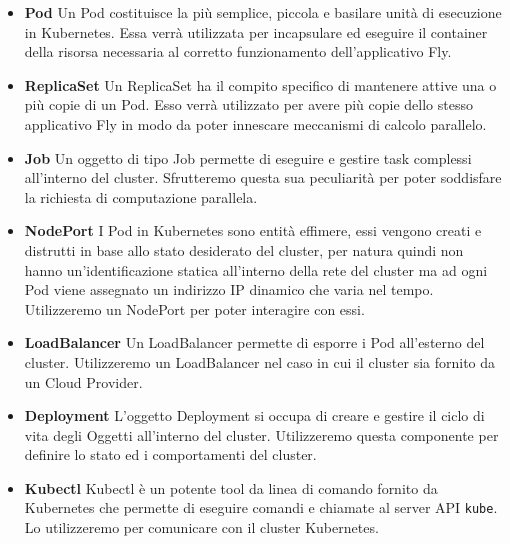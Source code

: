 \begin{itemize}
  \item\textbf{Pod} Un Pod costituisce la più semplice, piccola e basilare unità di esecuzione in Kubernetes. Essa verrà utilizzata per incapsulare ed eseguire il container della risorsa necessaria al corretto funzionamento
  dell'applicativo Fly.
  \item\textbf{ReplicaSet} Un ReplicaSet ha il compito specifico di mantenere attive una o più copie di un Pod. Esso verrà utilizzato per avere più copie dello stesso applicativo Fly in modo da poter innescare meccanismi di calcolo parallelo.
  \item\textbf{Job} Un oggetto di tipo Job permette di eseguire e gestire task complessi all'interno del cluster. Sfrutteremo questa sua peculiarità per poter soddisfare la richiesta di computazione parallela.
  \item\textbf{NodePort} I Pod in Kubernetes sono entità effimere, essi vengono creati e distrutti in base allo stato desiderato del cluster, per natura quindi non hanno un'identificazione statica all'interno della rete del cluster ma ad ogni Pod viene assegnato un indirizzo IP dinamico che varia nel tempo.
  Utilizzeremo un NodePort per poter interagire con essi.
  \item\textbf{LoadBalancer} Un LoadBalancer permette di esporre i Pod all'esterno del cluster. Utilizzeremo un LoadBalancer nel caso in cui il cluster sia fornito da un Cloud Provider.
  \item\textbf{Deployment} L'oggetto Deployment si occupa di creare e gestire il ciclo di vita degli Oggetti all'interno del cluster. Utilizzeremo questa componente per definire lo stato ed i comportamenti del cluster.
  \item\textbf{Kubectl} Kubectl è un potente tool da linea di comando fornito da Kubernetes che permette di eseguire comandi e chiamate al server API \verb|kube|. Lo utilizzeremo per comunicare con il cluster Kubernetes. 
\end{itemize}



